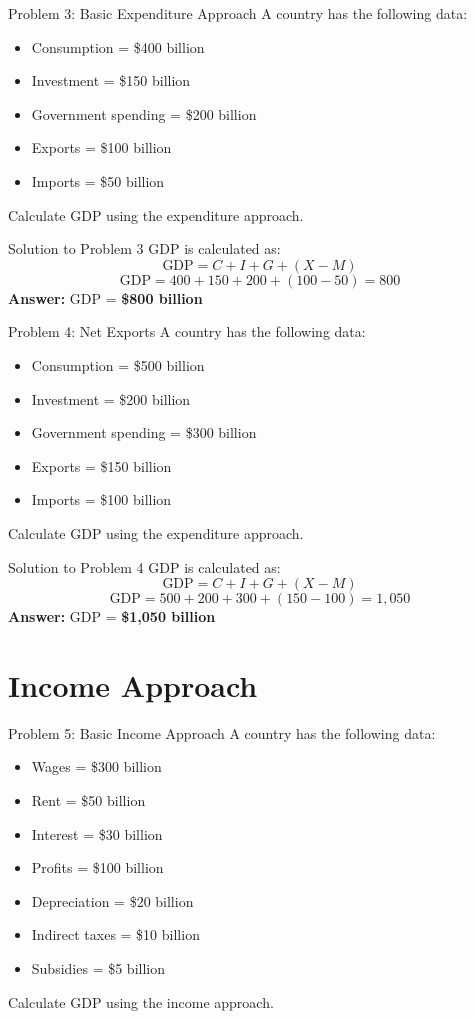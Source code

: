 \documentclass{beamer}
\begin{document}
\begin{frame}{Problem 3: Basic Expenditure Approach}
A country has the following data:
\begin{itemize}
    \item Consumption = \$400 billion
    \item Investment = \$150 billion
    \item Government spending = \$200 billion
    \item Exports = \$100 billion
    \item Imports = \$50 billion
\end{itemize}
Calculate GDP using the expenditure approach.
\end{frame}

\begin{frame}{Solution to Problem 3}
GDP is calculated as:
\[
\text{GDP} = C + I + G + (X - M)
\]
\[
\text{GDP} = 400 + 150 + 200 + (100 - 50) = 800
\]
\textbf{Answer:} GDP = \textbf{\$800 billion}
\end{frame}

\begin{frame}{Problem 4: Net Exports}
A country has the following data:
\begin{itemize}
    \item Consumption = \$500 billion
    \item Investment = \$200 billion
    \item Government spending = \$300 billion
    \item Exports = \$150 billion
    \item Imports = \$100 billion
\end{itemize}
Calculate GDP using the expenditure approach.
\end{frame}

\begin{frame}{Solution to Problem 4}
GDP is calculated as:
\[
\text{GDP} = C + I + G + (X - M)
\]
\[
\text{GDP} = 500 + 200 + 300 + (150 - 100) = 1,050
\]
\textbf{Answer:} GDP = \textbf{\$1,050 billion}
\end{frame}

\section{Income Approach}

\begin{frame}{Problem 5: Basic Income Approach}
A country has the following data:
\begin{itemize}
    \item Wages = \$300 billion
    \item Rent = \$50 billion
    \item Interest = \$30 billion
    \item Profits = \$100 billion
    \item Depreciation = \$20 billion
    \item Indirect taxes = \$10 billion
    \item Subsidies = \$5 billion
\end{itemize}
Calculate GDP using the income approach.
\end{frame}
\end{document}
